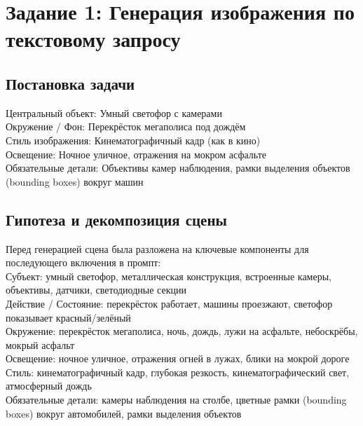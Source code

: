 \newpage
\section*{Задание 1: Генерация изображения по текстовому запросу}
\subsection{Постановка задачи}
\noindent
Центральный объект: Умный светофор с камерами \\
Окружение / Фон: Перекрёсток мегаполиса под дождём \\
Стиль изображения: Кинематографичный кадр (как в кино) \\
Освещение: Ночное уличное, отражения на мокром асфальте \\
Обязательные детали: Объективы камер наблюдения, рамки выделения объектов (bounding boxes) вокруг машин \\
\subsection{Гипотеза и декомпозиция сцены}
\noindent
Перед генерацией сцена была разложена на ключевые компоненты для последующего включения в промпт:\\
Субъект: умный светофор, металлическая конструкция, встроенные камеры, объективы, датчики, светодиодные секции\\
Действие / Состояние: перекрёсток работает, машины проезжают, светофор показывает красный/зелёный\\
Окружение: перекрёсток мегаполиса, ночь, дождь, лужи на асфальте, небоскрёбы, мокрый асфальт\\
Освещение: ночное уличное, отражения огней в лужах, блики на мокрой дороге\\
Стиль:	кинематографичный кадр, глубокая резкость, кинематографический свет, атмосферный дождь\\
Обязательные детали:	камеры наблюдения на столбе, цветные рамки (bounding boxes) вокруг автомобилей, рамки выделения объектов\\
